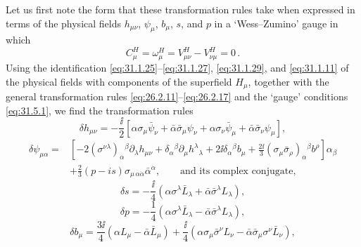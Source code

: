 Let us first note the form that these transformation rules take when
expressed in terms of the physical fields \(h_{\mu\nu}\), \(\psi_\mu\),
\(b_\mu\), \(s\), and \(p\) in a `Wess--Zumino' gauge in which
\begin{equation}
  C_\mu^H=\omega_\mu^H=V_{\mu\nu}^H-V_{\nu\mu}^H=0\,.
  \tag{31.5.1}\label{eq:31.5.1}
\end{equation}
Using the identification \eqref{eq:31.1.25}--\eqref{eq:31.1.27},
\eqref{eq:31.1.29}, and \eqref{eq:31.1.11} of the physical fields with
components of the superfield \(H_\mu\), together with the general
transformation rules \eqref{eq:26.2.11}--\eqref{eq:26.2.17} and the
`gauge' conditions \eqref{eq:31.5.1}, we find the transformation rules
\begin{equation}
  \delta h_{\mu\nu}
  =-\frac{\ii}{2}\left[
    \alpha\sigma_\mu\bar\psi_\nu
    +\bar\alpha\bar\sigma_\mu\psi_\nu
    +\alpha\sigma_\nu\bar\psi_\mu
    +\bar\alpha\bar\sigma_\nu\psi_\mu
  \right],
  \tag{31.5.2}\label{eq:31.5.2}
\end{equation}
\begin{equation}
  \begin{aligned}
  \delta\psi_{\mu\alpha}
  ={}&\left[
      -2(\sigma^{\nu\lambda})_\alpha{}^\beta
         \partial_\lambda h_{\mu\nu}
      +\delta_\alpha{}^\beta\partial_\mu h^\lambda{}_\lambda
      +2\ii\delta_\alpha{}^\beta b_\mu
      +\frac{2\ii}{3}
        (\sigma_\mu\bar\sigma_\rho)_\alpha{}^\beta b^\rho
    \right]\alpha_\beta\\
   &+\frac{2}{3}(p-is)
      \sigma_{\mu\,\alpha\dot\alpha}\bar\alpha^{\dot\alpha},
  \qquad\text{and its complex conjugate},
  \end{aligned}
  \tag{31.5.3}\label{eq:31.5.3}
\end{equation}
\begin{equation}
  \delta s=-\frac{\ii}{4}\left(
    \alpha\sigma^\lambda\bar L_\lambda
    +\bar\alpha\bar\sigma^\lambda L_\lambda\right),
  \tag{31.5.4}\label{eq:31.5.4}
\end{equation}
\begin{equation}
  \delta p=-\frac14\left(
    \alpha\sigma^\lambda\bar L_\lambda
    -\bar\alpha\bar\sigma^\lambda L_\lambda\right),
  \tag{31.5.5}\label{eq:31.5.5}
\end{equation}
\begin{equation}
  \delta b_\mu
  =\frac{3\ii}{4}\left(\alpha L_\mu-\bar\alpha\bar L_\mu\right)
   +\frac{\ii}{4}\left(
      \alpha\sigma_\mu\bar\sigma^\nu L_\nu
      -\bar\alpha\bar\sigma_\mu\sigma^\nu\bar L_\nu
    \right),
  \tag{31.5.6}\label{eq:31.5.6}
\end{equation}

